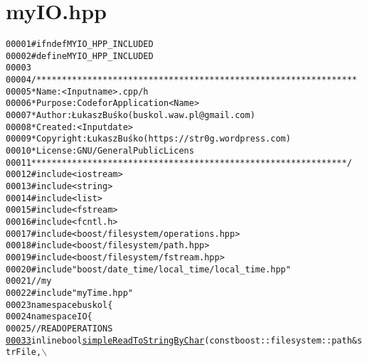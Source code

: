 \hypertarget{myIO_8hpp_source}{
\section{myIO.hpp}
}


\begin{footnotesize}\begin{alltt}
00001 \textcolor{preprocessor}{#ifndef MYIO\_HPP\_INCLUDED}
00002 \textcolor{preprocessor}{}\textcolor{preprocessor}{#define MYIO\_HPP\_INCLUDED}
00003 \textcolor{preprocessor}{}
00004 \textcolor{comment}{/***************************************************************}
00005 \textcolor{comment}{ * Name:      <Input name>.cpp/h}
00006 \textcolor{comment}{ * Purpose:   Code for Application <Name>}
00007 \textcolor{comment}{ * Author:    Łukasz Buśko (buskol.waw.pl@gmail.com)}
00008 \textcolor{comment}{ * Created:   <Input date>}
00009 \textcolor{comment}{ * Copyright: Łukasz Buśko (https://str0g.wordpress.com)}
00010 \textcolor{comment}{ * License:   GNU / General Public Licens}
00011 \textcolor{comment}{ **************************************************************/}
00012 \textcolor{preprocessor}{#include <iostream>}
00013 \textcolor{preprocessor}{#include <string>}
00014 \textcolor{preprocessor}{#include <list>}
00015 \textcolor{preprocessor}{#include <fstream>}
00016 \textcolor{preprocessor}{#include <fcntl.h>}
00017 \textcolor{preprocessor}{#include <boost/filesystem/operations.hpp>}
00018 \textcolor{preprocessor}{#include <boost/filesystem/path.hpp>}
00019 \textcolor{preprocessor}{#include <boost/filesystem/fstream.hpp>}
00020 \textcolor{preprocessor}{#include "boost/date\_time/local\_time/local\_time.hpp"}
00021 \textcolor{comment}{//my}
00022 \textcolor{preprocessor}{#include "myTime.hpp"}
00023 \textcolor{keyword}{namespace }buskol\{
00024     \textcolor{keyword}{namespace }IO\{
00025     \textcolor{comment}{//READ OPERATIONS}
\hypertarget{myIO_8hpp_source_l00033}{}\hyperlink{group__libbuskol_gaa00dee734dcb4383da401abcaa508c70}{00033} \textcolor{comment}{}    \textcolor{keyword}{inline} \textcolor{keywordtype}{bool} \hyperlink{group__libbuskol_gaa00dee734dcb4383da401abcaa508c70}{simpleReadToStringByChar}(\textcolor{keyword}{const} boost::filesystem::path &strFile,\(\backslash\)
      

\end{alltt}
\end{footnotesize}
